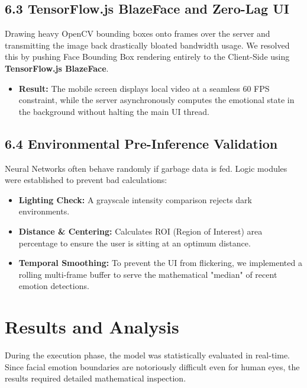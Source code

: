 \documentclass[12pt,a4paper]{report}
\begin{document}
\section*{6.3 TensorFlow.js BlazeFace and Zero-Lag UI}
Drawing heavy OpenCV bounding boxes onto frames over the server and transmitting the image back drastically bloated bandwidth usage. We resolved this by pushing Face Bounding Box rendering entirely to the Client-Side using \textbf{TensorFlow.js BlazeFace}.
\begin{itemize}
    \item \textbf{Result:} The mobile screen displays local video at a seamless 60 FPS constraint, while the server asynchronously computes the emotional state in the background without halting the main UI thread.
\end{itemize}

\section*{6.4 Environmental Pre-Inference Validation}
Neural Networks often behave randomly if garbage data is fed. Logic modules were established to prevent bad calculations:
\begin{itemize}
    \item \textbf{Lighting Check:} A grayscale intensity comparison rejects dark environments.
    \item \textbf{Distance \& Centering:} Calculates ROI (Region of Interest) area percentage to ensure the user is sitting at an optimum distance.
    \item \textbf{Temporal Smoothing:} To prevent the UI from flickering, we implemented a rolling multi-frame buffer to serve the mathematical "median" of recent emotion detections.
\end{itemize}

\clearpage


\chapter{Results and Analysis}

During the execution phase, the model was statistically evaluated in real-time. Since facial emotion boundaries are notoriously difficult even for human eyes, the results required detailed mathematical inspection.
\end{document}
